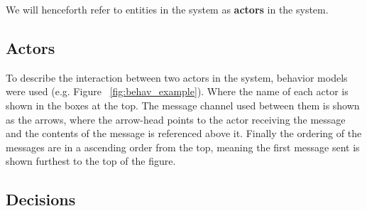 We will henceforth refer to entities in the system as \textbf{actors} in the system.

\subsection{Actors}





To describe the interaction between two actors in the system, behavior models were used (e.g. Figure ~\ref{fig:behav_example}). Where the name of each actor is shown in the boxes at the top. The message channel used between them is shown as the arrows, where the arrow-head points to the actor receiving the message and the contents of the message is referenced above it. Finally the ordering of the messages are in a ascending order from the top, meaning the first message sent is shown furthest to the top of the figure.






\subsection{Decisions}

